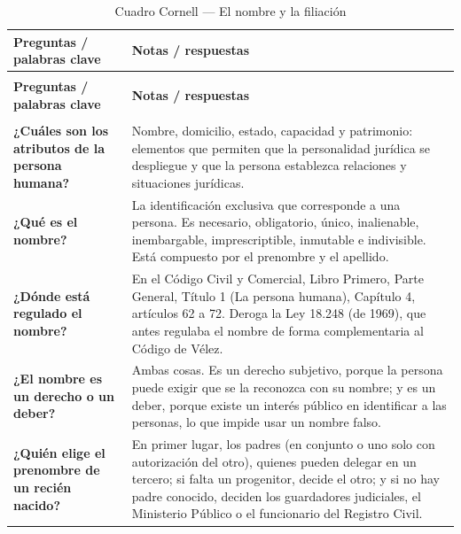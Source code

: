 \documentclass[12pt,oneside]{book}
\begin{document}
\begin{longtable}{
    >{\raggedright\arraybackslash}p{}
    >{\raggedright\arraybackslash}p{}
}
\caption{Cuadro Cornell --- El nombre y la filiación} \\
\toprule
\textbf{Preguntas / palabras clave} & \textbf{Notas / respuestas} \\
\midrule
\endfirsthead

\multicolumn{2}{c}{\textbf{\tablename\ \thetable{} (continuación)}} \\
\toprule
\textbf{Preguntas / palabras clave} & \textbf{Notas / respuestas} \\
\midrule
\endhead

\midrule
\multicolumn{2}{r}{\textit{Continúa en la página siguiente}} \\
\endfoot

\bottomrule
\endlastfoot

\textbf{¿Cuáles son los atributos de la persona humana?} &
Nombre, domicilio, estado, capacidad y patrimonio: elementos que permiten que la personalidad jurídica se despliegue y que la persona establezca relaciones y situaciones jurídicas. \\

\textbf{¿Qué es el nombre?} &
La identificación exclusiva que corresponde a una persona. Es necesario, obligatorio, único, inalienable, inembargable, imprescriptible, inmutable e indivisible. Está compuesto por el prenombre y el apellido. \\

\textbf{¿Dónde está regulado el nombre?} &
En el Código Civil y Comercial, Libro Primero, Parte General, Título 1 (La persona humana), Capítulo 4, artículos 62 a 72. Deroga la Ley 18.248 (de 1969), que antes regulaba el nombre de forma complementaria al Código de Vélez. \\

\textbf{¿El nombre es un derecho o un deber?} &
Ambas cosas. Es un derecho subjetivo, porque la persona puede exigir que se la reconozca con su nombre; y es un deber, porque existe un interés público en identificar a las personas, lo que impide usar un nombre falso. \\

\textbf{¿Quién elige el prenombre de un recién nacido?} &
En primer lugar, los padres (en conjunto o uno solo con autorización del otro), quienes pueden delegar en un tercero; si falta un progenitor, decide el otro; y si no hay padre conocido, deciden los guardadores judiciales, el Ministerio Público o el funcionario del Registro Civil. \\


\end{longtable}
\end{document}
